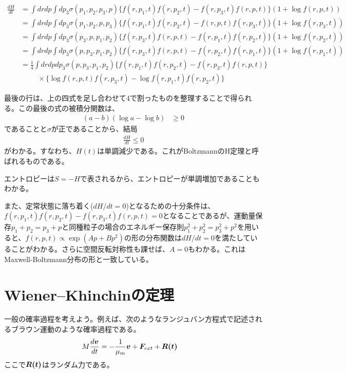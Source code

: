 \documentclass[uplatex,dvipdfmx]{jsarticle}
\begin{document}
\begin{align}
    \frac{dH}{dt} &= \int drdp \int dp_3 \sigma(p_1,p_2,p_3,p) \{f(r,p_1,t)f(r,p_2,t)-f(r, p_3, t)f(r, p,t)\}(1+\log f(r,p,t)) \\ 
        &= \int drdp \int dp_3 \sigma(p_1,p_2,p,p_3) \{f(r,p_1,t)f(r,p_2,t)-f(r, p, t)f(r, p_3,t)\}(1+\log f(r,p_3,t)) \\
        &= \int drdp \int dp_3 \sigma(p_3,p,p_1,p_2) \{f(r,p_3,t)f(r,p,t)-f(r, p_1, t)f(r, p_2,t)\}(1+\log f(r,p_2,t)) \\
        &= \int drdp \int dp_3 \sigma(p,p_3,p_1,p_2) \{f(r,p_3,t)f(r,p,t)-f(r, p_2, t)f(r, p_1,t)\}(1+\log f(r,p_1,t)) \\
        &= \frac{1}{4} \int drdpdp_3 \sigma(p,p_3,p_1,p_2)
            \{ f(r,p_1,t)f(r,p_2,t) - f(r,p_3,t)f(r,p,t) \} \\
        & \hspace{1cm} \times \{\log f(r,p,t)f(r,p_3,t)- \log f(r,p_1,t)f(r,p_2,t)\}
\end{align}

最後の行は、上の四式を足し合わせて4で割ったものを整理することで得られる。この最後の式の被積分関数は、
\begin{align*}
    (a-b)(\log a-\log b) &\geq 0 
\end{align*}
であることと$\sigma$が正であることから、結局
\begin{align}
    \frac{dH}{dt} \leq 0    
\end{align}
がわかる。すなわち、$H(t)$は単調減少である。これがBoltzmannのH定理と呼ばれるものである。

エントロピーは$S=-H$で表されるから、エントロピーが単調増加であることもわかる。

また、定常状態に落ち着く($dH/dt = 0$)となるための十分条件は、$f(r,p_1,t)f(r,p_2,t) - f(r,p_3,t)f(r,p,t)=0 $となることであるが、運動量保存$p_1+p_2 = p_3 + p$と同種粒子の場合のエネルギー保存則$p_1^2+p_2^2 = p_3^2+p^2$を用いると、$f(r,p,t)\propto \exp(Ap+Bp^2)$の形の分布関数は$dH/dt=0$を満たしていることがわかる。さらに空間反転対称性も課せば、$A=0$もわかる。これはMaxwell-Boltzmann分布の形と一致している。

\section{Wiener–Khinchinの定理}
一般の確率過程を考えよう。例えば、次のようなランジュバン方程式で記述されるブラウン運動のような確率過程である。
\begin{align}
    M\frac{d\vb*{v}}{dt} &= -\frac{1}{\mu_m} \vb*{v} + \vb*{F}_{ext} + \vb*{R(t)} \label{eq:langevin}
\end{align}
ここで$\vb*{R(t)}$はランダム力である。
\end{document}
